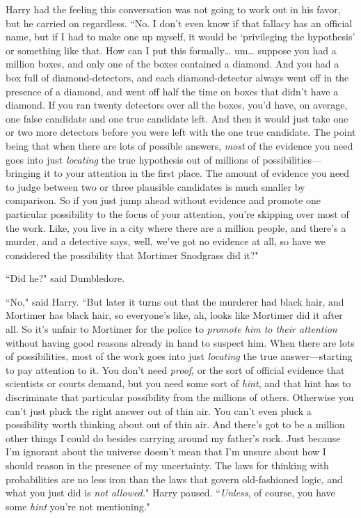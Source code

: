 Harry had the feeling this conversation was not going to work out in his favor, but he carried on regardless. ``No. I don't even know if that fallacy has an official name, but if I had to make one up myself, it would be `privileging the hypothesis' or something like that. How can I put this formally{\ldots} um{\ldots} suppose you had a million boxes, and only one of the boxes contained a diamond. And you had a box full of diamond-detectors, and each diamond-detector always went off in the presence of a diamond, and went off half the time on boxes that didn't have a diamond. If you ran twenty detectors over all the boxes, you'd have, on average, one false candidate and one true candidate left. And then it would just take one or two more detectors before you were left with the one true candidate. The point being that when there are lots of possible answers, \emph{most} of the evidence you need goes into just \emph{locating} the true hypothesis out of millions of possibilities—bringing it to your attention in the first place. The amount of evidence you need to judge between two or three plausible candidates is much smaller by comparison. So if you just jump ahead without evidence and promote one particular possibility to the focus of your attention, you're skipping over most of the work. Like, you live in a city where there are a million people, and there's a murder, and a detective says, well, we've got no evidence at all, so have we considered the possibility that Mortimer Snodgrass did it?"

``Did he?" said Dumbledore.

``No," said Harry. ``But later it turns out that the murderer had black hair, and Mortimer has black hair, so everyone's like, ah, looks like Mortimer did it after all. So it's unfair to Mortimer for the police to \emph{promote him to their attention} without having good reasons already in hand to suspect him. When there are lots of possibilities, most of the work goes into just \emph{locating} the true answer—starting to pay attention to it. You don't need \emph{proof}, or the sort of official evidence that scientists or courts demand, but you need some sort of \emph{hint}, and that hint has to discriminate that particular possibility from the millions of others. Otherwise you can't just pluck the right answer out of thin air. You can't even pluck a possibility worth thinking about out of thin air. And there's got to be a million other things I could do besides carrying around my father's rock. Just because I'm ignorant about the universe doesn't mean that I'm unsure about how I should reason in the presence of my uncertainty. The laws for thinking with probabilities are no less iron than the laws that govern old-fashioned logic, and what you just did is \emph{not allowed.}" Harry paused. ``\emph{Unless}, of course, you have some \emph{hint} you're not mentioning."

